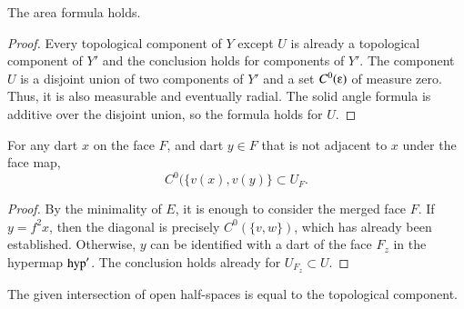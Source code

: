 \begin{lemma} The area formula holds.
\end{lemma}

\begin{proof} Every topological component of $Y$ 
except $U$ is already a topological component of $Y'$ and the conclusion
holds for components of $Y'$.  The component $U$ is a disjoint union of two
components of $Y'$ and a set $C^0(\e)$ of measure zero.  Thus, it
is also measurable and eventually radial.  The solid angle formula is
additive over the disjoint union, so the formula holds for $U$.
\end{proof}

\begin{lemma}  For any dart $x$ on the face $F$, and dart $y\in F$ that is not adjacent to $x$ under the face map, 
$$
C^0(\{v(x),v(y)\} \subset U_F.
$$
\end{lemma}

\begin{proof}
By the minimality of $E$, it is enough to consider the merged face $F$.  
If $y=f^2x$, then the diagonal is precisely $C^0(\{v,w\})$,
which has already been established.  Otherwise, $y$ can be identified with
a dart of the face $F_z$ in the hypermap ${\operatorname{hyp}}'$.  The conclusion holds
already for $U_{F_z}\subset U$.  
\end{proof}


\begin{lemma} The given intersection of open half-spaces is equal
to the topological component. 
\end{lemma}

